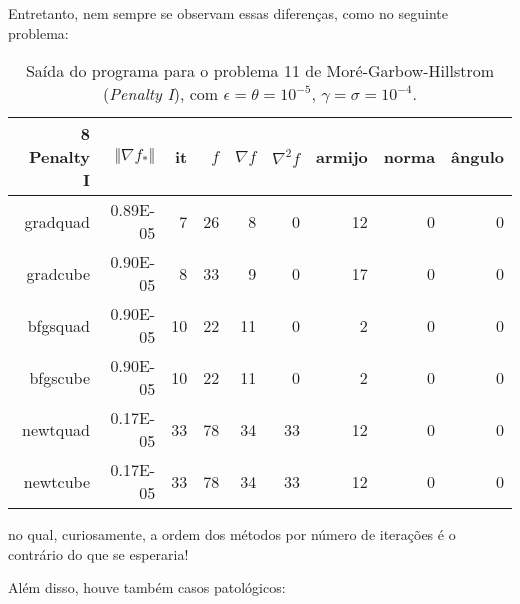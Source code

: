 \documentclass[a4paper,11pt]{article}
\begin{document}
            Entretanto, nem sempre se observam essas diferenças, como no seguinte problema:

            \begin{table}[h!]
                \centering
                \begin{tabular}{r|rrrrrrrr}
                    8 Penalty I & $\Vert\nabla f_*\Vert$ & it & $f$ & $\nabla f $ & $\nabla^2f$ & armijo & norma & ângulo \\
                    \hline
                    gradquad&  0.89E-05&         7&        26&         8&         0&        12&         0&         0 \\
                    gradcube&  0.90E-05&         8&        33&         9&         0&        17&         0&         0 \\
                    bfgsquad&  0.90E-05&        10&        22&        11&         0&         2&         0&         0 \\
                    bfgscube&  0.90E-05&        10&        22&        11&         0&         2&         0&         0 \\
                    newtquad&  0.17E-05&        33&        78&        34&        33&        12&         0&         0 \\
                    newtcube&  0.17E-05&        33&        78&        34&        33&        12&         0&         0 \\
                \end{tabular}
                \caption{Saída do programa para o problema 11 de Moré-Garbow-Hillstrom (\emph{Penalty I}), com $\epsilon = \theta = 10^{-5} $, $\gamma = \sigma = 10^{-4}$.}
            \end{table}
            no qual, curiosamente, a ordem dos métodos por número de iterações é o contrário do que se esperaria!

            Além disso, houve também casos patológicos:
\end{document}
